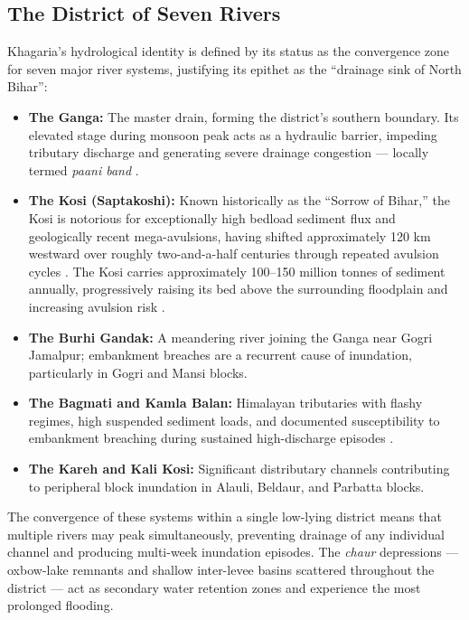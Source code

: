\documentclass[12pt, a4paper]{article}
\begin{document}
\subsection{The District of Seven Rivers}

Khagaria's hydrological identity is defined by its status as the convergence zone for seven major river systems, justifying its epithet as the ``drainage sink of North Bihar'':

\begin{itemize}
    \item \textbf{The Ganga:} The master drain, forming the district's southern boundary. Its elevated stage during monsoon peak acts as a hydraulic barrier, impeding tributary discharge and generating severe drainage congestion --- locally termed \textit{paani band} \citep{beams2024}.
    \item \textbf{The Kosi (Saptakoshi):} Known historically as the ``Sorrow of Bihar,'' the Kosi is notorious for exceptionally high bedload sediment flux and geologically recent mega-avulsions, having shifted approximately 120 km westward over roughly two-and-a-half centuries through repeated avulsion cycles \citep{sinha2008, mishra2018}. The Kosi carries approximately 100--150 million tonnes of sediment annually, progressively raising its bed above the surrounding floodplain and increasing avulsion risk \citep{sinha2008}.
    \item \textbf{The Burhi Gandak:} A meandering river joining the Ganga near Gogri Jamalpur; embankment breaches are a recurrent cause of inundation, particularly in Gogri and Mansi blocks.
    \item \textbf{The Bagmati and Kamla Balan:} Himalayan tributaries with flashy regimes, high suspended sediment loads, and documented susceptibility to embankment breaching during sustained high-discharge episodes \citep{mishra2018}.
    \item \textbf{The Kareh and Kali Kosi:} Significant distributary channels contributing to peripheral block inundation in Alauli, Beldaur, and Parbatta blocks.
\end{itemize}

The convergence of these systems within a single low-lying district means that multiple rivers may peak simultaneously, preventing drainage of any individual channel and producing multi-week inundation episodes. The \textit{chaur} depressions --- oxbow-lake remnants and shallow inter-levee basins scattered throughout the district --- act as secondary water retention zones and experience the most prolonged flooding.
\end{document}
